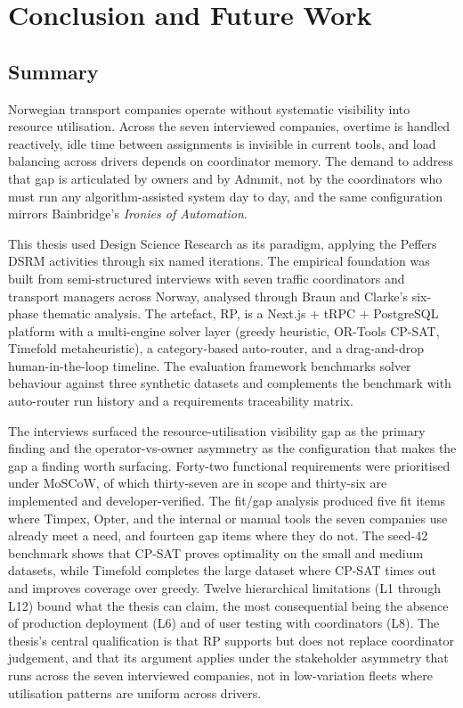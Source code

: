 \chapter{Conclusion and Future Work}
\label{chap:conclusion}

\section{Summary}
\label{sec:summary}

Norwegian transport companies operate without systematic visibility into resource utilisation. Across the seven interviewed companies, overtime is handled reactively, idle time between assignments is invisible in current tools, and load balancing across drivers depends on coordinator memory. The demand to address that gap is articulated by owners and by Admmit, not by the coordinators who must run any algorithm-assisted system day to day, and the same configuration mirrors Bainbridge's \emph{Ironies of Automation}.

This thesis used Design Science Research as its paradigm, applying the Peffers DSRM activities through six named iterations. The empirical foundation was built from semi-structured interviews with seven traffic coordinators and transport managers across Norway, analysed through Braun and Clarke's six-phase thematic analysis. The artefact, RP, is a Next.js + tRPC + PostgreSQL platform with a multi-engine solver layer (greedy heuristic, OR-Tools CP-SAT, Timefold metaheuristic), a category-based auto-router, and a drag-and-drop human-in-the-loop timeline. The evaluation framework benchmarks solver behaviour against three synthetic datasets and complements the benchmark with auto-router run history and a requirements traceability matrix.

The interviews surfaced the resource-utilisation visibility gap as the primary finding and the operator-vs-owner asymmetry as the configuration that makes the gap a finding worth surfacing. Forty-two functional requirements were prioritised under MoSCoW, of which thirty-seven are in scope and thirty-six are implemented and developer-verified. The fit/gap analysis produced five fit items where Timpex, Opter, and the internal or manual tools the seven companies use already meet a need, and fourteen gap items where they do not. The seed-42 benchmark shows that CP-SAT proves optimality on the small and medium datasets, while Timefold completes the large dataset where CP-SAT times out and improves coverage over greedy. Twelve hierarchical limitations (L1 through L12) bound what the thesis can claim, the most consequential being the absence of production deployment (L6) and of user testing with coordinators (L8). The thesis's central qualification is that RP supports but does not replace coordinator judgement, and that its argument applies under the stakeholder asymmetry that runs across the seven interviewed companies, not in low-variation fleets where utilisation patterns are uniform across drivers.


